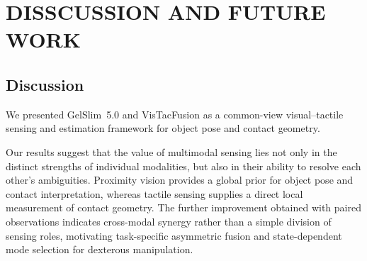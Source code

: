 \documentclass[letterpaper,10pt,conference]{ieeeconf}
\newcommand{\sensor}{GelSlim~5.0}
\newcommand{\method}{VisTacFusion}
\begin{document}

\section{DISSCUSSION AND FUTURE WORK}
\label{sec:conclusion_future_work}

\subsection{Discussion}

We presented \sensor{} and \method{} as a common-view visual--tactile sensing and estimation framework for object pose and contact geometry.

Our results suggest that the value of multimodal sensing lies not only in the distinct strengths of individual modalities, but also in their ability to resolve each other's ambiguities. Proximity vision provides a global prior for object pose and contact interpretation, whereas tactile sensing supplies a direct local measurement of contact geometry. The further improvement obtained with paired observations indicates cross-modal synergy rather than a simple division of sensing roles, motivating task-specific asymmetric fusion and state-dependent mode selection for dexterous manipulation.
\end{document}
